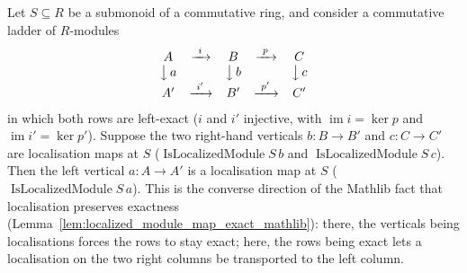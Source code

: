 \begin{lemma}
  \label{lem:isLocalizedModule_of_exact}
  Let \(S \subseteq R\) be a submonoid of a commutative ring, and consider a commutative ladder of
  \(R\)-modules
  \[
    \begin{array}{ccccc}
      A & \xrightarrow{\ i\ } & B & \xrightarrow{\ p\ } & C \\
      \big\downarrow{\,a} & & \big\downarrow{\,b} & & \big\downarrow{\,c} \\
      A' & \xrightarrow{\ i'\ } & B' & \xrightarrow{\ p'\ } & C'
    \end{array}
  \]
  in which both rows are left-exact (\(i\) and \(i'\) injective, with \(\operatorname{im} i = \ker p\) and
  \(\operatorname{im} i' = \ker p'\)). Suppose the two right-hand verticals \(b : B \to B'\) and
  \(c : C \to C'\) are localisation maps at \(S\) (\(\operatorname{IsLocalizedModule} S\, b\) and
  \(\operatorname{IsLocalizedModule} S\, c\)). Then the left vertical \(a : A \to A'\) is a localisation map
  at \(S\) (\(\operatorname{IsLocalizedModule} S\, a\)). This is the converse direction of the Mathlib fact
  that localisation preserves exactness (Lemma~\ref{lem:localized_module_map_exact_mathlib}): there, the
  verticals being localisations forces the rows to stay exact; here, the rows being exact lets a
  localisation on the two right columns be transported to the left column.
\end{lemma}
